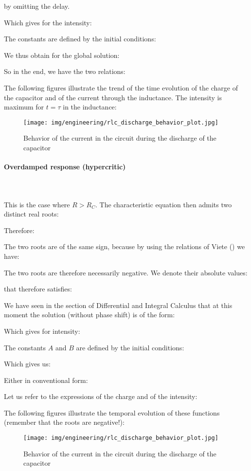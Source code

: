 	by omitting the delay.
	
	Which gives for the intensity:
	
	The constants are defined by the initial conditions:
	
	We thus obtain for the global solution:
	
	So in the end, we have the two relations:
	
	The following figures illustrate the trend of the time evolution of the charge of the capacitor and of the current through the inductance. The intensity is maximum for $t=\tau$ in the inductance:
	\begin{figure}[H]
		\centering
		\texttt{[image: img/engineering/rlc\_discharge\_behavior\_plot.jpg]}
		\caption[]{Behavior of the current in the circuit during the discharge of the capacitor}
	\end{figure}
	
	\paragraph{Overdamped response (hypercritic)}\mbox{}\\\\
	This is the case where $R>R_C$. The characteristic equation then admits two distinct real roots:
	
	Therefore:
	
	The two roots are of the same sign, because by using the relations of Viete () we have:
	
	The two roots are therefore necessarily negative. We denote their absolute values:
	
	that therefore satisfies:
	
	We have seen in the section of Differential and Integral Calculus that at this moment the solution (without phase shift) is of the form:
	
	Which gives for intensity:
	
	The constants $A$ and $B$ are defined by the initial conditions:
	
	Which gives us:
	
	Either in conventional form:
	
	Let us refer to the expressions of the charge and of the intensity:
	
	The following figures illustrate the temporal evolution of these functions (remember that the roots are negative!):
	 \begin{figure}[H]
		\centering
		\texttt{[image: img/engineering/rlc\_discharge\_behavior\_plot.jpg]}
		\caption[]{Behavior of the current in the circuit during the discharge of the capacitor}
	\end{figure}
	
